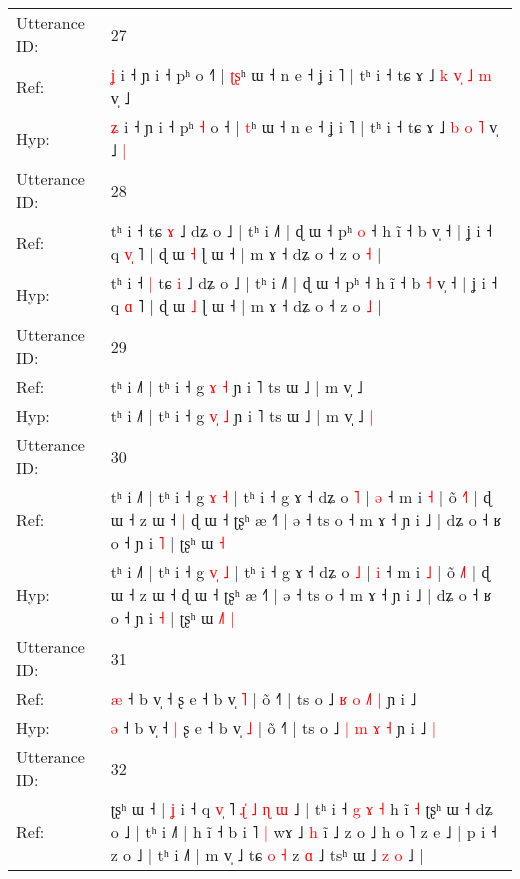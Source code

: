 \documentclass[10pt]{article}
\DeclareRobustCommand{\hl}[1]{{\textcolor{red}{#1}}}
\begin{document}
\begin{longtable}{ll}
 \\
\midrule
Utterance ID: & 27 \\
Ref: & \hl{ʝ} i ˧ ɲ i ˧ pʰ\hl{}\hl{} o ˧\hl{˥} | \hl{ʈ}\hl{ʂ}ʰ ɯ ˧ n e ˧ ʝ i ˥ | tʰ i ˧ tɕ ɤ ˩\hl{ }\hl{k} \hl{v}\hl{̩} \hl{˩} \hl{m} v̩ ˩\hl{}\hl{}
 \\
Hyp: & \hl{ʑ} i ˧ ɲ i ˧ pʰ\hl{ }\hl{˧} o ˧\hl{} | \hl{}\hl{t}ʰ ɯ ˧ n e ˧ ʝ i ˥ | tʰ i ˧ tɕ ɤ ˩\hl{}\hl{} \hl{}\hl{b} \hl{o} \hl{˥} v̩ ˩\hl{ }\hl{|}
 \\
\midrule
Utterance ID: & 28 \\
Ref: & tʰ i ˧\hl{}\hl{} tɕ \hl{ɤ} ˩ dʑ o ˩ | tʰ i ˩˥ | ɖ ɯ ˧ pʰ\hl{ }\hl{o} ˧ h ĩ ˧ b\hl{}\hl{} v̩ ˧ | ʝ i ˧ q \hl{v}\hl{̩} ˥ | ɖ ɯ \hl{˧} ɭ ɯ ˧ | m ɤ ˧ dʑ o ˧ z o \hl{˧} |
 \\
Hyp: & tʰ i ˧\hl{ }\hl{|} tɕ \hl{i} ˩ dʑ o ˩ | tʰ i ˩˥ | ɖ ɯ ˧ pʰ\hl{}\hl{} ˧ h ĩ ˧ b\hl{ }\hl{˧} v̩ ˧ | ʝ i ˧ q \hl{}\hl{ɑ} ˥ | ɖ ɯ \hl{˩} ɭ ɯ ˧ | m ɤ ˧ dʑ o ˧ z o \hl{˩} |
 \\
\midrule
Utterance ID: & 29 \\
Ref: & tʰ i ˩˥ | tʰ i ˧ g \hl{}\hl{ɤ} \hl{˧} ɲ i ˥ ts ɯ ˩ | m v̩ ˩\hl{}\hl{}
 \\
Hyp: & tʰ i ˩˥ | tʰ i ˧ g \hl{v}\hl{̩} \hl{˩} ɲ i ˥ ts ɯ ˩ | m v̩ ˩\hl{ }\hl{|}
 \\
\midrule
Utterance ID: & 30 \\
Ref: & tʰ i ˩˥ | tʰ i ˧ g \hl{}\hl{ɤ} \hl{˧} | tʰ i ˧ g ɤ ˧ dʑ o \hl{˥} | \hl{ə} ˧ m i \hl{˧} | õ \hl{˧}˥ | ɖ ɯ ˧ z ɯ ˧\hl{ }\hl{|} ɖ ɯ ˧ ʈʂʰ æ ˧˥ | ə ˧ ts o ˧ m ɤ ˧ ɲ i ˩ | dʑ o ˧ ʁ o ˧ ɲ i \hl{˥} | ʈʂʰ ɯ\hl{}\hl{}\hl{} \hl{˧}
 \\
Hyp: & tʰ i ˩˥ | tʰ i ˧ g \hl{v}\hl{̩} \hl{˩} | tʰ i ˧ g ɤ ˧ dʑ o \hl{˩} | \hl{i} ˧ m i \hl{˩} | õ \hl{˩}˥ | ɖ ɯ ˧ z ɯ ˧\hl{}\hl{} ɖ ɯ ˧ ʈʂʰ æ ˧˥ | ə ˧ ts o ˧ m ɤ ˧ ɲ i ˩ | dʑ o ˧ ʁ o ˧ ɲ i \hl{˧} | ʈʂʰ ɯ\hl{ }\hl{˩}\hl{˥} \hl{|}
 \\
\midrule
Utterance ID: & 31 \\
Ref: & \hl{æ} ˧ b v̩ ˧\hl{}\hl{} ʂ e ˧ b v̩ \hl{˥} | õ ˧˥ | ts o ˩ \hl{ʁ} \hl{o} \hl{˩}\hl{˥} \hl{|} ɲ i ˩\hl{}\hl{}
 \\
Hyp: & \hl{ə} ˧ b v̩ ˧\hl{ }\hl{|} ʂ e ˧ b v̩ \hl{˩} | õ ˧˥ | ts o ˩ \hl{|} \hl{m} \hl{}\hl{ɤ} \hl{˧} ɲ i ˩\hl{ }\hl{|}
 \\
\midrule
Utterance ID: & 32 \\
Ref: & ʈʂʰ ɯ ˧ |\hl{ }\hl{ʝ} i ˧ q\hl{ }\hl{v}\hl{̩} ˥ \hl{ɻ}\hl{̍} \hl{˩} \hl{ɳ}\hl{ }\hl{ɯ} ˩ | tʰ i ˧ \hl{g}\hl{ }\hl{ɤ} \hl{˧} h ĩ\hl{ }\hl{˧} ʈʂʰ ɯ ˧ dʑ o ˩ | tʰ i ˩˥ | h ĩ ˧ b i ˥\hl{ }\hl{|} wɤ ˩ \hl{h} i\hl{̃} ˩ z o ˩ h o ˥ z e ˩ | p i ˧ z o ˩ | tʰ i ˩˥ | m v̩ ˩ tɕ \hl{o} \hl{˧} z \hl{ɑ} ˩ tsʰ ɯ ˩ \hl{z} \hl{o} ˩ |

\end{longtable}
\end{document}
